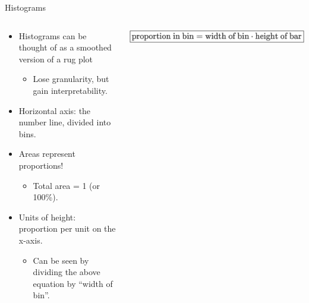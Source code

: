 \documentclass[aspectratio=169]{../latex_main/tntbeamer}  %
\begin{document}
    
     \begin{frame}{Histograms}
        \begin{columns}
            \begin{column}{.6\textwidth}
                    \begin{itemize}
                        \item Histograms can be thought of as a smoothed version of a rug plot
                        \begin{itemize}
                            \item Lose granularity, but gain interpretability.
                        \end{itemize}
                        \item Horizontal axis: the number line, divided into bins.
                        \item Areas represent proportions!
                        \begin{itemize}
                            \item Total area = 1 (or 100\%).
                        \end{itemize}
                        \item Units of height: proportion per unit on the x-axis.
                        \begin{itemize}
                            \item Can be seen by dividing the above equation by “width of bin”.
                        \end{itemize}
                    \end{itemize}
            \end{column}
            
            
            \begin{column}{.4\textwidth}
            
                       \centering
                       \includegraphics[scale=.5]{Bild27}
                       
            \end{column}
        \end{columns}
    \end{frame}
    
\end{document}
